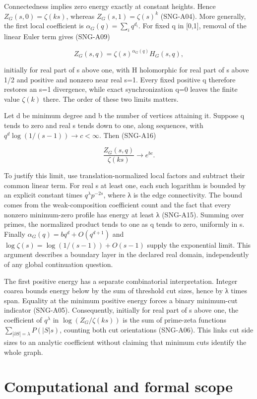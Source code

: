 \documentclass[
  11pt,
  a4paper,
]{article}
\begin{document}
Connectedness implies zero energy exactly at constant heights. Hence
\(Z_G(s,0)=\zeta(ks)\), whereas \(Z_G(s,1)=\zeta(s)^k\) (SNG-A04). More
generally, the first local coefficient is \(\alpha_G(q)=\sum_iq^{d_i}\).
For fixed q in {[}0,1{]}, removal of the linear Euler term gives
(SNG-A09)

\[
 Z_G(s,q)=\zeta(s)^{\alpha_G(q)}H_G(s,q),
\]

initially for real part of s above one, with H holomorphic for real part
of s above 1/2 and positive and nonzero near real s=1. Every fixed
positive q therefore restores an s=1 divergence, while exact
synchronization q=0 leaves the finite value \(\zeta(k)\) there. The
order of these two limits matters.

Let d be minimum degree and b the number of vertices attaining it.
Suppose q tends to zero and real s tends down to one, along sequences,
with \(q^d\log(1/(s-1))\to c<\infty\). Then (SNG-A16)

\[
 \frac{Z_G(s,q)}{\zeta(ks)}\longrightarrow e^{bc}.
\]

To justify this limit, use translation-normalized local factors and
subtract their common linear term. For real s at least one, each such
logarithm is bounded by an explicit constant times
\(q^\lambda p^{-2s}\), where λ is the edge connectivity. The bound comes
from the weak-composition coefficient count and the fact that every
nonzero minimum-zero profile has energy at least λ (SNG-A15). Summing
over primes, the normalized product tends to one as q tends to zero,
uniformly in s. Finally \(\alpha_G(q)=bq^d+O(q^{d+1})\) and
\(\log\zeta(s)=\log(1/(s-1))+O(s-1)\) supply the exponential limit. This
argument describes a boundary layer in the declared real domain,
independently of any global continuation question.

The first positive energy has a separate combinatorial interpretation.
Integer coarea bounds energy below by the sum of threshold cut sizes,
hence by λ times span. Equality at the minimum positive energy forces a
binary minimum-cut indicator (SNG-A05). Consequently, initially for real
part of s above one, the coefficient of \(q^\lambda\) in
\(\log(Z_G/\zeta(ks))\) is the sum of prime-zeta functions
\(\sum_{|\partial S|=\lambda}P(|S|s)\), counting both cut orientations
(SNG-A06). This links cut side sizes to an analytic coefficient without
claiming that minimum cuts identify the whole graph.

\hypertarget{computational-and-formal-scope}{%
\section{Computational and formal
scope}\label{computational-and-formal-scope}}
\end{document}
